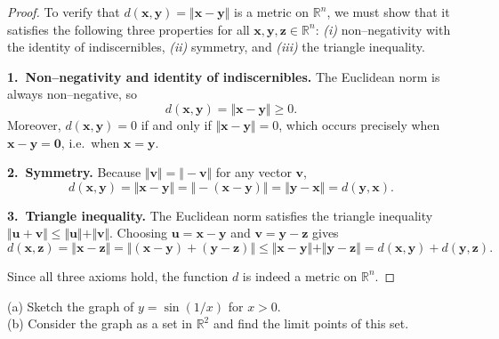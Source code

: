 \documentclass[10pt]{extarticle}
\begin{document}
\begin{proof}
    To verify that $d(\mathbf{x}, \mathbf{y}) = \Vert \mathbf{x} - \mathbf{y} \Vert$ is a metric on $\mathbb{R}^n$, we must show that it satisfies the following three properties for all $\mathbf{x}, \mathbf{y}, \mathbf{z} \in \mathbb{R}^n$:
    \emph{(i)} non--negativity with the identity of indiscernibles, \emph{(ii)} symmetry, and \emph{(iii)} the triangle inequality.

    \medskip
    \textbf{1.~Non--negativity and identity of indiscernibles.} The Euclidean norm is always non--negative, so
    $$
        d(\mathbf{x}, \mathbf{y}) = \Vert \mathbf{x} - \mathbf{y} \Vert \ge 0.
    $$
    Moreover, $d(\mathbf{x}, \mathbf{y}) = 0$ if and only if $\Vert \mathbf{x} - \mathbf{y} \Vert = 0$, which occurs precisely when $\mathbf{x} - \mathbf{y} = \mathbf{0}$, i.e.~when $\mathbf{x} = \mathbf{y}$.

    \medskip
    \textbf{2.~Symmetry.} Because $\Vert \mathbf{v} \Vert = \Vert -\mathbf{v} \Vert$ for any vector $\mathbf{v}$,
    $$
        d(\mathbf{x}, \mathbf{y}) = \Vert \mathbf{x} - \mathbf{y} \Vert = \Vert -(\mathbf{x} - \mathbf{y}) \Vert = \Vert \mathbf{y} - \mathbf{x} \Vert = d(\mathbf{y}, \mathbf{x}).
    $$

    \medskip
    \textbf{3.~Triangle inequality.} The Euclidean norm satisfies the triangle inequality $\Vert \mathbf{u} + \mathbf{v} \Vert \le \Vert \mathbf{u} \Vert + \Vert \mathbf{v} \Vert$. Choosing $\mathbf{u} = \mathbf{x} - \mathbf{y}$ and $\mathbf{v} = \mathbf{y} - \mathbf{z}$ gives
    $$
        d(\mathbf{x}, \mathbf{z}) = \Vert \mathbf{x} - \mathbf{z} \Vert = \Vert (\mathbf{x} - \mathbf{y}) + (\mathbf{y} - \mathbf{z}) \Vert \le \Vert \mathbf{x} - \mathbf{y} \Vert + \Vert \mathbf{y} - \mathbf{z} \Vert = d(\mathbf{x}, \mathbf{y}) + d(\mathbf{y}, \mathbf{z}).
    $$

    Since all three axioms hold, the function $d$ is indeed a metric on $\mathbb{R}^n$.
\end{proof}
\begin{exercise}[4.2]
    (a) Sketch the graph of $y=\sin(1/x)$ for $x>0$.\\
    (b) Consider the graph as a set in $\mathbb{R}^2$ and find the limit points of this set.
\end{exercise}
\end{document}
